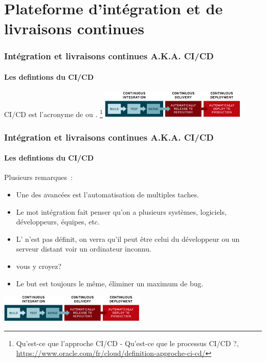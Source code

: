 \documentclass{beamer}
\begin{document}
    \section{Plateforme d’intégration et de livraisons continues}\label{sec:plateforme-dintegration-et-de-livraisons-continues}

    \begin{frame}
        \frametitle{Intégration et livraisons continues A.K.A. CI/CD}
        \framesubtitle{Les defintions du CI/CD}
        \transdissolve
        CI/CD est l'acronyme de  ou .
        \bigbreak
        \footnote{Qu'est-ce que l'approche CI/CD - Qu’est-ce que le processus CI/CD ?, \url{https://www.oracle.com/fr/cloud/definition-approche-ci-cd/}}
        \bigbreak
        \centering
        \includegraphics[width=7cm]{image/ci-cd-flow.png}
    \end{frame}

    \begin{frame}
        \frametitle{Intégration et livraisons continues A.K.A. CI/CD}
        \framesubtitle{Les defintions du CI/CD}
        \transdissolve
        Plusieurs remarques~:
        \begin{itemize}
            \item Une des avancées est l'automatisation de multiples taches.
            \item Le mot intégration fait penser qu'on a plusieurs systèmes, logiciels, développeurs, équipes, etc.
            \item L' n'est pas définit, on verra qu'il peut être celui du développeur ou un serveur distant voir un ordinateur inconnu.
            \item {} vous y croyez?
            \item Le but est toujours le même, éliminer un maximum de bug.
        \end{itemize}
        \bigbreak
        \centering
        \includegraphics[width=7cm]{image/ci-cd-flow.png}
    \end{frame}
\end{document}
